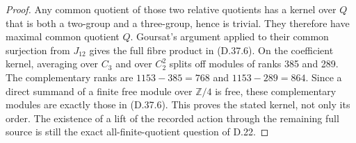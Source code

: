 \begin{proof}
Any common quotient of those two relative quotients
has a kernel over $Q$ that is both a two-group and a
three-group, hence is trivial. They therefore have
maximal common quotient $Q$. Goursat's argument applied
to their common surjection from $J_{12}$ gives the full
fibre product in (D.37.6). On the coefficient kernel,
averaging over $C_3$ and over $C_2^2$ splits off modules
of ranks 385 and 289. The complementary ranks are
$1153-385=768$ and $1153-289=864$. Since a direct summand
of a finite free module over $\mathbb Z/4$ is free,
these complementary modules are exactly those in
(D.37.6). This proves the stated kernel, not only its
order. The existence of a lift of the recorded action
through the remaining full source is still the exact
all-finite-quotient question of D.22.
\end{proof}
